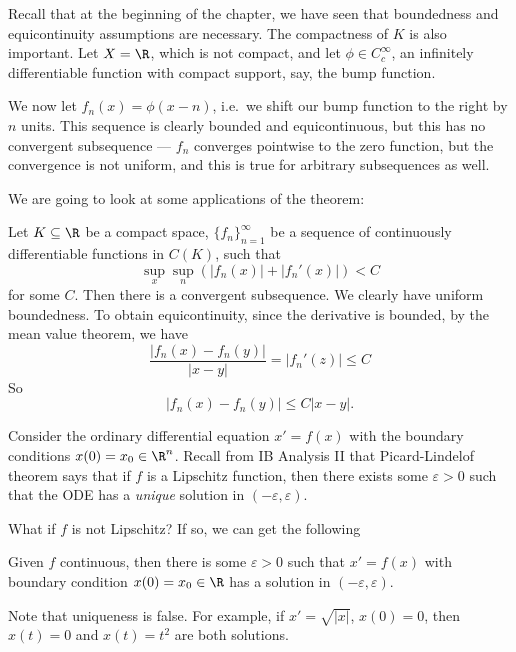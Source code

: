 \documentclass[a4paper]{article}
\begin{document}
Recall that at the beginning of the chapter, we have seen that boundedness and equicontinuity assumptions are necessary. The compactness of $K$ is also important. Let $X = \R$, which is not compact, and let $\phi \in C_c^{\infty}$, an infinitely differentiable function with compact support, say, the bump function.
\begin{center}
\end{center}
We now let $f_n(x) = \phi(x - n)$, i.e.\ we shift our bump function to the right by $n$ units. This sequence is clearly bounded and equicontinuous, but this has no convergent subsequence --- $f_n$ converges pointwise to the zero function, but the convergence is not uniform, and this is true for arbitrary subsequences as well.

We are going to look at some applications of the theorem:

\begin{eg}
  Let $K\subseteq \R$ be a compact space, $\{f_n\}_{n = 1}^\infty$ be a sequence of continuously differentiable functions in $C(K)$, such that
  \[
    \sup_x \sup_n (|f_n(x)| + |f_n'(x)|) < C
  \]
  for some $C$. Then there is a convergent subsequence. We clearly have uniform boundedness. To obtain equicontinuity, since the derivative is bounded, by the mean value theorem, we have
  \[
    \frac{|f_n(x) - f_n(y)|}{|x - y|} = |f_n'(z)| \leq C
  \]
  So
  \[
    |f_n(x) - f_n(y)| \leq C |x - y|.
  \]
\end{eg}

Consider the ordinary differential equation $x' = f(x)$ with the boundary conditions $x(0) = x_0 \in \R^n$. Recall from IB Analysis II that Picard-Lindelof theorem says that if $f$ is a Lipschitz function, then there exists some $\varepsilon > 0$ such that the ODE has a \emph{unique} solution in $(-\varepsilon, \varepsilon)$.

What if $f$ is not Lipschitz? If so, we can get the following
\begin{thm}[Peano*]
  Given $f$ continuous, then there is some $\varepsilon > 0$ such that $x' = f(x)$ with boundary condition $x(0) = x_0 \in \R$ has a solution in $(-\varepsilon, \varepsilon)$.
\end{thm}
Note that uniqueness is false. For example, if $x' = \sqrt{|x|}$, $x(0) = 0$, then $x(t) = 0$ and $x(t) = t^2$ are both solutions.
\end{document}
